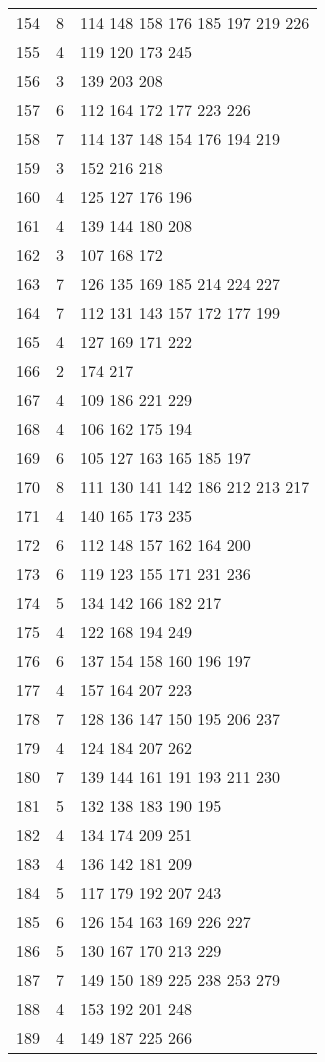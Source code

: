 \documentclass{standalone}
\begin{document}
\begin{tabular}{c c l}
154 & 8 & 114 148 158 176 185 197 219 226 \\
155 & 4 & 119 120 173 245 \\
156 & 3 & 139 203 208 \\
157 & 6 & 112 164 172 177 223 226 \\
158 & 7 & 114 137 148 154 176 194 219 \\
159 & 3 & 152 216 218 \\
160 & 4 & 125 127 176 196 \\
161 & 4 & 139 144 180 208 \\
162 & 3 & 107 168 172 \\
163 & 7 & 126 135 169 185 214 224 227 \\
164 & 7 & 112 131 143 157 172 177 199 \\
165 & 4 & 127 169 171 222 \\
166 & 2 & 174 217 \\
167 & 4 & 109 186 221 229 \\
168 & 4 & 106 162 175 194 \\
169 & 6 & 105 127 163 165 185 197 \\
170 & 8 & 111 130 141 142 186 212 213 217 \\
171 & 4 & 140 165 173 235 \\
172 & 6 & 112 148 157 162 164 200 \\
173 & 6 & 119 123 155 171 231 236 \\
174 & 5 & 134 142 166 182 217 \\
175 & 4 & 122 168 194 249 \\
176 & 6 & 137 154 158 160 196 197 \\
177 & 4 & 157 164 207 223 \\
178 & 7 & 128 136 147 150 195 206 237 \\
179 & 4 & 124 184 207 262 \\
180 & 7 & 139 144 161 191 193 211 230 \\
181 & 5 & 132 138 183 190 195 \\
182 & 4 & 134 174 209 251 \\
183 & 4 & 136 142 181 209 \\
184 & 5 & 117 179 192 207 243 \\
185 & 6 & 126 154 163 169 226 227 \\
186 & 5 & 130 167 170 213 229 \\
187 & 7 & 149 150 189 225 238 253 279 \\
188 & 4 & 153 192 201 248 \\
189 & 4 & 149 187 225 266 \\

\end{tabular}
\end{document}
